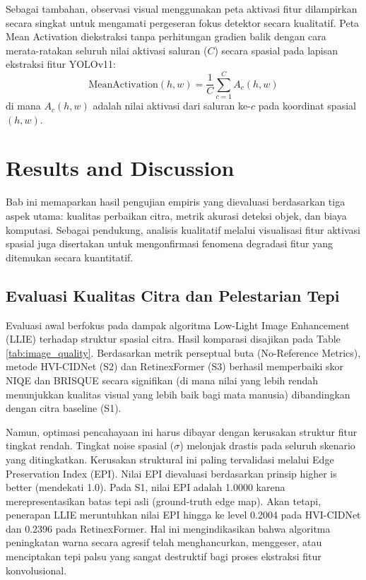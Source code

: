 \documentclass[conference]{IEEEtran}
\begin{document}
Sebagai tambahan, observasi visual menggunakan peta aktivasi fitur dilampirkan secara singkat untuk mengamati pergeseran fokus detektor secara kualitatif. Peta Mean Activation diekstraksi tanpa perhitungan gradien balik dengan cara merata-ratakan seluruh nilai aktivasi saluran ($C$) secara spasial pada lapisan ekstraksi fitur YOLOv11:
\begin{equation}
\text{MeanActivation}(h, w) = \frac{1}{C} \sum_{c=1}^{C} A_c(h, w)
\end{equation}
di mana $A_c(h, w)$ adalah nilai aktivasi dari saluran ke-$c$ pada koordinat spasial $(h, w)$.


\section{Results and Discussion}

Bab ini memaparkan hasil pengujian empiris yang dievaluasi berdasarkan tiga aspek utama: kualitas perbaikan citra, metrik akurasi deteksi objek, dan biaya komputasi. Sebagai pendukung, analisis kualitatif melalui visualisasi fitur aktivasi spasial juga disertakan untuk mengonfirmasi fenomena degradasi fitur yang ditemukan secara kuantitatif.

\subsection{Evaluasi Kualitas Citra dan Pelestarian Tepi}
Evaluasi awal berfokus pada dampak algoritma Low-Light Image Enhancement (LLIE) terhadap struktur spasial citra. Hasil komparasi disajikan pada Table \ref{tab:image_quality}. Berdasarkan metrik perseptual buta (No-Reference Metrics), metode HVI-CIDNet (S2) dan RetinexFormer (S3) berhasil memperbaiki skor NIQE dan BRISQUE secara signifikan (di mana nilai yang lebih rendah menunjukkan kualitas visual yang lebih baik bagi mata manusia) dibandingkan dengan citra baseline (S1). 

Namun, optimasi pencahayaan ini harus dibayar dengan kerusakan struktur fitur tingkat rendah. Tingkat noise spasial ($\sigma$) melonjak drastis pada seluruh skenario yang ditingkatkan. Kerusakan struktural ini paling tervalidasi melalui Edge Preservation Index (EPI). Nilai EPI dievaluasi berdasarkan prinsip higher is better (mendekati 1.0). Pada S1, nilai EPI adalah 1.0000 karena merepresentasikan batas tepi asli (ground-truth edge map). Akan tetapi, penerapan LLIE meruntuhkan nilai EPI hingga ke level 0.2004 pada HVI-CIDNet dan 0.2396 pada RetinexFormer. Hal ini mengindikasikan bahwa algoritma peningkatan warna secara agresif telah menghancurkan, menggeser, atau menciptakan tepi palsu yang sangat destruktif bagi proses ekstraksi fitur konvolusional.
\end{document}
